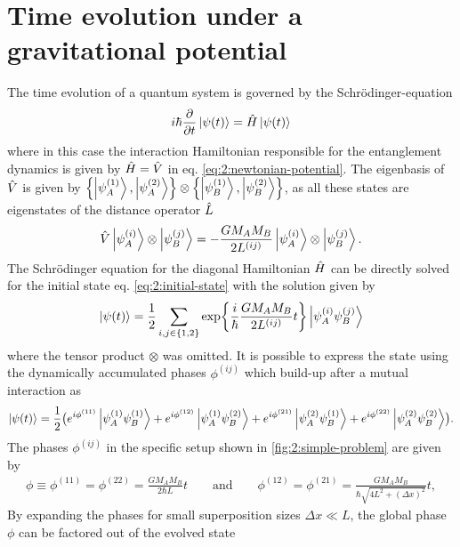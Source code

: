 \section{Time evolution under a gravitational potential}\label{sec:2:time-evolution}

The time evolution of a quantum system is governed by the Schrödinger-equation
\begin{equation}
  i\hbar \pdv{t} \ket{\psi(t)} = \hat{H} \ket{\psi(t)}
\end{equation}
where in this case the interaction Hamiltonian responsible for the entanglement dynamics is given by $\hat{H} = \hat{V}$ in eq. \eqref{eq:2:newtonian-potential}.
The eigenbasis of $\hat{V}$ is given by $\left\{ \ket{\psi_A^{(1)}}, \ket{\psi_A^{(2)}} \right\}\otimes \left\{ \ket{\psi_B^{(1)}}, \ket{\psi_B^{(2)}} \right\}$, as all these states are eigenstates of the distance operator $\hat{L}$
\begin{equation}
  \hat{V} \ket{\psi^{(i)}_A} \otimes \ket{\psi^{(j)}_B} = -\frac{G M_A M_B}{2L^{(ij)}} \ket{\psi^{(i)}_A} \otimes \ket{\psi^{(j)}_B} .
\end{equation}
The Schrödinger equation for the diagonal Hamiltonian $\hat{H}$ can be directly solved for the initial state eq. \eqref{eq:2:initial-state} with the solution given by 
\begin{equation}
  \ket{\psi(t)} = \frac{1}{2} \sum_{i,j\in\{1,2\}} \exp{\frac{i}{\hbar} \frac{G M_A M_B}{2L^{(ij)}} t} \ket{\psi^{(i)}_A \psi^{(j)}_B}
\end{equation}
where the tensor product $\otimes$ was omitted.
It is possible to express the state using the dynamically accumulated phases $\phi^{(ij)}$ which build-up after a mutual interaction as
\begin{equation}\label{eq:2:evolved-state}
  \ket{\psi(t)} = \frac{1}{2}\bigl(
    e^{i\phi^{(11)}} \ket{\psi_A^{(1)} \psi_B^{(1)}} 
    + e^{i\phi^{(12)}} \ket{\psi_A^{(1)} \psi_B^{(2)}}
    + e^{i\phi^{(21)}} \ket{\psi_A^{(2)} \psi_B^{(1)}} 
    + e^{i\phi^{(22)}} \ket{\psi_A^{(2)} \psi_B^{(2)}} \bigr) .
\end{equation}
The phases $\phi^{(ij)}$ in the specific setup shown in \cref{fig:2:simple-problem} are given by
\begin{align}
  \phi \equiv \phi^{(11)} = \phi^{(22)} = \frac{G M_A M_B}{2\hbar L}t 
  \qquad \text{and} \qquad 
  \phi^{(12)} = \phi^{(21)} = \frac{G M_A M_B}{\hbar \sqrt{4L^2 + (\Delta x)^2}}t ,
\end{align}
By expanding the phases for small superposition sizes $\Delta x \ll L$, the global phase $\phi$ can be factored out of the evolved state
